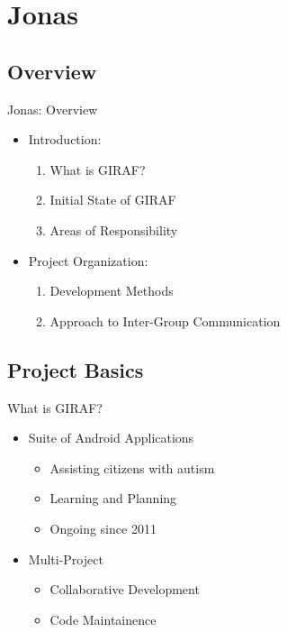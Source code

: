 \section{Jonas}
\subsection{Overview}
\begin{frame}{Jonas: Overview}
\begin{itemize}
	\item Introduction:
  		\begin{enumerate}
			\item What is GIRAF?
			\item Initial State of GIRAF
			\item Areas of Responsibility
		\end{enumerate}
	\item Project Organization:
		\begin{enumerate}
			\item Development Methods
			\item Approach to Inter-Group Communication
		\end{enumerate}
\end{itemize}
\end{frame}
 
\subsection{Project Basics}
\begin{frame}{What is GIRAF?}
\begin{itemize}
	\item Suite of Android Applications
		\begin{itemize}
		    \item Assisting citizens with autism 
  			\item Learning and Planning
  			\item Ongoing since 2011
		\end{itemize}
	\item Multi-Project
		\begin{itemize}
		    \item Collaborative Development 
  			\item Code Maintainence
		\end{itemize}
\end{itemize}
\end{frame}

